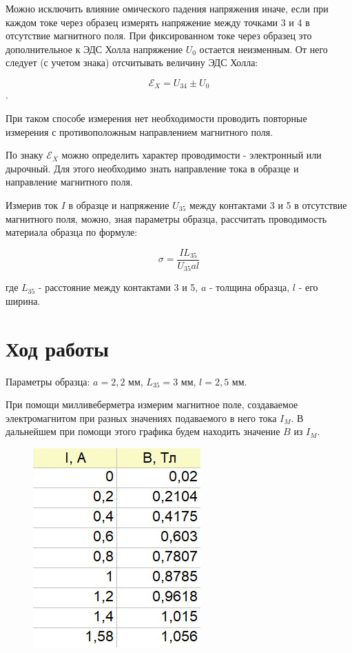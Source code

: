 \documentclass[a4paper,12pt]{article}
\begin{document}
  	Можно исключить влияние омического падения напряжения иначе, если при каждом токе через образец измерять напряжение между точками 3 и 4 в отсутствие магнитного поля. При фиксированном токе через образец это дополнительное к ЭДС Холла напряжение $U_{0}$ остается неизменным. От него следует (с учетом
  	знака) отсчитывать величину ЭДС Холла: 
  	
  	$$\mathcal{E}_{X} = U_{34} \pm U_{0}$$. 
  	
  	При таком способе измерения нет необходимости проводить повторные измерения с противоположным направлением магнитного поля.
  	
  	
  	По знаку $\mathcal{E}_{X}$ можно определить характер проводимости - электронный или дырочный. Для этого необходимо знать направление тока в образце и направление
  	магнитного поля.
  	
  	Измерив ток $I$ в образце и напряжение $U_{35}$ между контактами 3 и 5 в отсутствие магнитного поля, можно, зная параметры образца, рассчитать проводимость материала образца по формуле:
  	
  \begin{equation}\label{sigma}
  	\sigma=\dfrac{IL_{35}}{U_{35}al}
  \end{equation}
  	
  	где $L_{35}$ - расстояние между контактами 3 и 5, $a$ - толщина образца, $l$ - его ширина.
  	\section{Ход работы}
Параметры образца: $a = 2,2$ мм, $ L_{35} = 3$ мм, $l = 2,5$ мм.

При помощи милливеберметра измерим магнитное поле, создаваемое электромагнитом при разных значениях подаваемого в него тока $I_M$. В дальнейшем при помощи этого графика будем находить значение $B$ из $I_M$.

\begin{figure}[H]
	\begin{center}	\includegraphics[width=.2\textwidth]{tabliza1.jpg}
	\end{center}
\end{figure}
\end{document}
